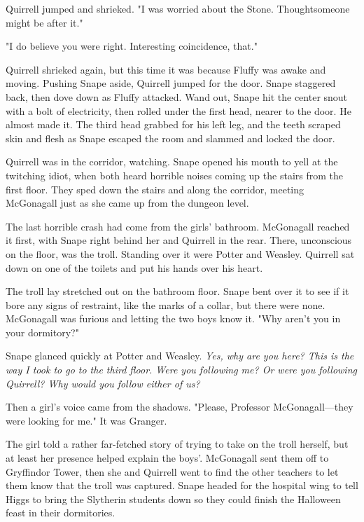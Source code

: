 Quirrell jumped and shrieked. "I{\el} was{\el} worried about the{\el} Stone. Thought{\el}someone might be{\el} after it."

"I do believe you were right. Interesting coincidence, that."

Quirrell shrieked again, but this time it was because Fluffy was awake and moving. Pushing Snape aside, Quirrell jumped for the door. Snape staggered back, then dove down as Fluffy attacked. Wand out, Snape hit the center snout with a bolt of electricity, then rolled under the first head, nearer to the door. He almost made it. The third head grabbed for his left leg, and the teeth scraped skin and flesh as Snape escaped the room and slammed and locked the door.

Quirrell was in the corridor, watching. Snape opened his mouth to yell at the twitching idiot, when both heard horrible noises coming up the stairs from the first floor. They sped down the stairs and along the corridor, meeting McGonagall just as she came up from the dungeon level.

The last horrible crash had come from the girls' bathroom. McGonagall reached it first, with Snape right behind her and Quirrell in the rear. There, unconscious on the floor, was the troll. Standing over it were Potter and Weasley. Quirrell sat down on one of the toilets and put his hands over his heart.

The troll lay stretched out on the bathroom floor. Snape bent over it to see if it bore any signs of restraint, like the marks of a collar, but there were none. McGonagall was furious and letting the two boys know it. "{\el}Why aren't you in your dormitory?"

Snape glanced quickly at Potter and Weasley. \emph{Yes, why are you here? This is the way I took to go to the third floor. Were you following me? Or were you following Quirrell? Why would you follow either of us?}

Then a girl's voice came from the shadows. "Please, Professor McGonagall—they were looking for me." It was Granger.

The girl told a rather far-fetched story of trying to take on the troll herself, but at least her presence helped explain the boys'. McGonagall sent them off to Gryffindor Tower, then she and Quirrell went to find the other teachers to let them know that the troll was captured. Snape headed for the hospital wing to tell Higgs to bring the Slytherin students down so they could finish the Halloween feast in their dormitories.

